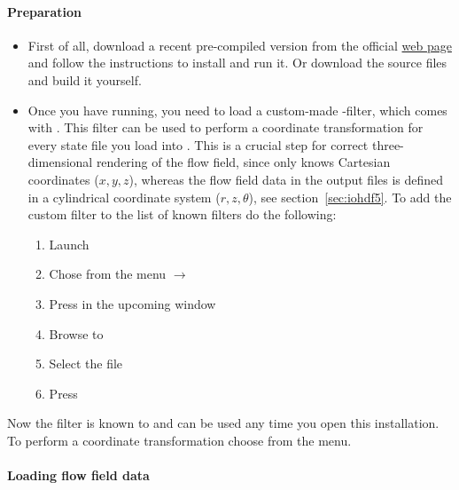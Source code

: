 \documentclass[a4paper, 11pt, DIV=11]{scrartcl}
\begin{document}
\paragraph{Preparation}
\begin{itemize}
\item First of all, download a recent pre-compiled version from the official
\href{www.paraview.org}{web page} and follow the instructions to install and
run it. Or download the source files and build it yourself.
\item Once you have \paraview running, you need to load a custom-made \python-filter,
which comes with \nsc. This filter can be used to perform a coordinate transformation
for every state file you load into \paraview. This is a crucial step for correct
three-dimensional rendering of the flow field, since \paraview only knows Cartesian
coordinates ($x, y, z$), whereas the flow field data in the \hdf output files is
defined in a cylindrical coordinate system ($r, z, \theta$), see section~\ref{sec:iohdf5}.
To add the custom filter to the list of known filters do the following:
\begin{enumerate}
\item Launch \paraview
\item Chose from the menu  $\to$ 
\item Press  in the upcoming window
\item Browse to 
\item Select the file 
\item Press 
\end{enumerate}
\end{itemize}
Now the filter is known to \paraview and can be used any time you open this
installation. To perform a coordinate transformation choose
 from the menu.

\paragraph{Loading flow field data}
\end{document}
